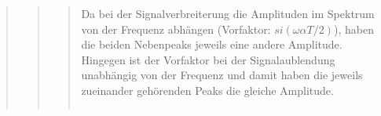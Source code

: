 \begin{quote}
\begin{quote}
\begin{quote}
            Da bei der Signalverbreiterung die Amplituden im Spektrum von der Frequenz abhängen (Vorfaktor: $si(\omega
             \alpha T/2)$), haben die beiden Nebenpeaks jeweils eine andere Amplitude. Hingegen ist der Vorfaktor bei
             der Signalaublendung unabhängig von der Frequenz und damit haben die jeweils zueinander
             gehörenden Peaks die gleiche Amplitude.
             
    
             
             
             
             
             
             \begin{center}
            \begin{tabular}{ll}
            

\end{tabular}
\end{center}
\end{quote}
\end{quote}
\end{quote}
